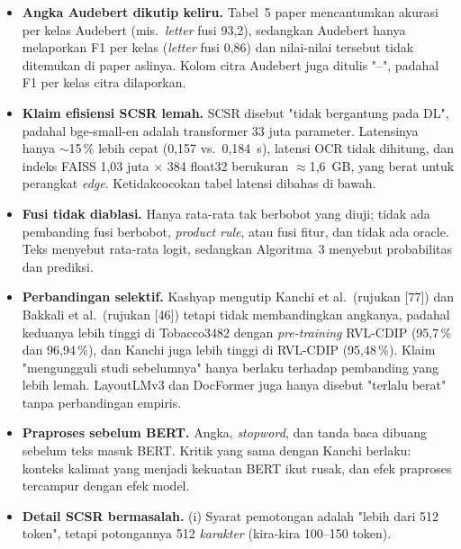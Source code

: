 \begin{itemize}
        120. Dengan 10 dokumen per kelas, akurasi \emph{memo} 72,73\,\% (= 8/11) dan
        63,60\,\% (= 7/11) tidak mungkin. Hanya 6 dari 16 kelas yang dilaporkan dan tidak
        ada akurasi total. Jumlah data latih juga berbeda: 319.625 (Algoritma) vs.\
        319.754 (Tabel~2).
  \item \textbf{Angka Audebert dikutip keliru.} Tabel~5 paper mencantumkan akurasi per
        kelas Audebert (mis.\ \emph{letter} fusi 93,2), sedangkan Audebert hanya
        melaporkan F1 per kelas (\emph{letter} fusi 0,86) dan nilai-nilai tersebut tidak
        ditemukan di paper aslinya. Kolom citra Audebert juga ditulis "--", padahal F1
        per kelas citra dilaporkan.
  \item \textbf{Klaim efisiensi SCSR lemah.} SCSR disebut "tidak bergantung pada DL",
        padahal bge-small-en adalah transformer 33 juta parameter. Latensinya hanya
        $\sim$15\,\% lebih cepat (0,157 vs.\ 0,184~s), latensi OCR tidak dihitung, dan
        indeks FAISS 1,03 juta $\times$ 384 float32 berukuran $\approx$1,6~GB, yang
        berat untuk perangkat \emph{edge}. Ketidakcocokan tabel latensi dibahas di bawah.
  \item \textbf{Fusi tidak diablasi.} Hanya rata-rata tak berbobot yang diuji; tidak ada
        pembanding fusi berbobot, \emph{product rule}, atau fusi fitur, dan tidak ada
        oracle. Teks menyebut rata-rata logit, sedangkan Algoritma~3 menyebut probabilitas
        dan prediksi.
  \item \textbf{Perbandingan selektif.} Kashyap mengutip Kanchi et al.\ (rujukan [77]) dan
        Bakkali et al.\ (rujukan [46]) tetapi tidak membandingkan angkanya, padahal
        keduanya lebih tinggi di Tobacco3482 dengan \emph{pre-training} RVL-CDIP (95,7\,\%
        dan 96,94\,\%), dan Kanchi juga lebih tinggi di RVL-CDIP (95,48\,\%). Klaim
        "mengungguli studi sebelumnya" hanya berlaku terhadap pembanding yang lebih
        lemah. LayoutLMv3 dan DocFormer juga hanya disebut "terlalu berat" tanpa
        perbandingan empiris.
  \item \textbf{Praproses sebelum BERT.} Angka, \emph{stopword}, dan tanda baca dibuang
        sebelum teks masuk BERT. Kritik yang sama dengan Kanchi berlaku: konteks kalimat
        yang menjadi kekuatan BERT ikut rusak, dan efek praproses tercampur dengan efek
        model.
  \item \textbf{Detail SCSR bermasalah.} (i) Syarat pemotongan adalah "lebih dari 512
        token", tetapi potongannya 512 \emph{karakter} (kira-kira 100--150 token).

\end{itemize}

